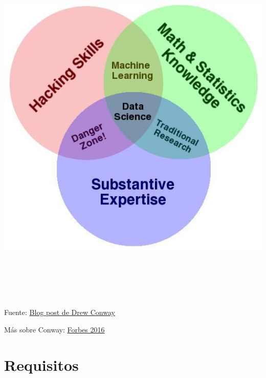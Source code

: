\documentclass[
]{book}
\begin{document}
\begin{center}\includegraphics[width=600pt,height=500pt]{img/01-intro2ds/10_data_science_vd} \end{center}

Fuente: \href{http://drewconway.com/zia/2013/3/26/the-data-science-venn-diagram}{Blog post de Drew Conway}

Más sobre Conway: \href{https://www.forbes.com/sites/joshwolfe/2016/03/03/using-data-science-for-the-physical-world/?sh=614ac5b0150e}{Forbes 2016}

\hypertarget{requisitos}{%
\section{Requisitos}\label{requisitos}}
\end{document}
